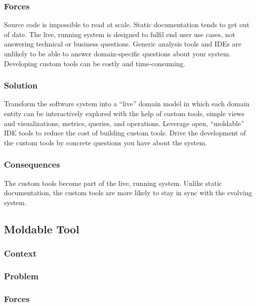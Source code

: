 \documentclass[sigconf]{acmart}
\begin{document}
\subsubsection*{Forces}

Source code is impossible to read at scale.
Static documentation tends to get out of date.
The live, running system is designed to fulfil end user use cases, not answering technical or business questions.
Generic analysis tools and IDEs are unlikely to be able to answer domain-specific questions about your system.
Developing custom tools can be costly and time-consuming.

\subsubsection*{Solution}

Transform the software system into a ``live'' domain model in which each domain entity can be interactively explored with the help of custom tools, \ie simple views and visualizations, metrics, queries, and operations.
Leverage open, ``moldable'' IDE tools to reduce the cost of building custom tools.
Drive the development of the custom tools by concrete questions you have about the system.


\subsubsection*{Consequences}

The custom tools become part of the live, running system.
Unlike static documentation, the custom tools are more likely to stay in sync with the evolving system.

\subsection*{Moldable Tool}\label{pat:moldableTool}

\subsubsection*{Context}
\subsubsection*{Problem}
\subsubsection*{Forces}
\end{document}
